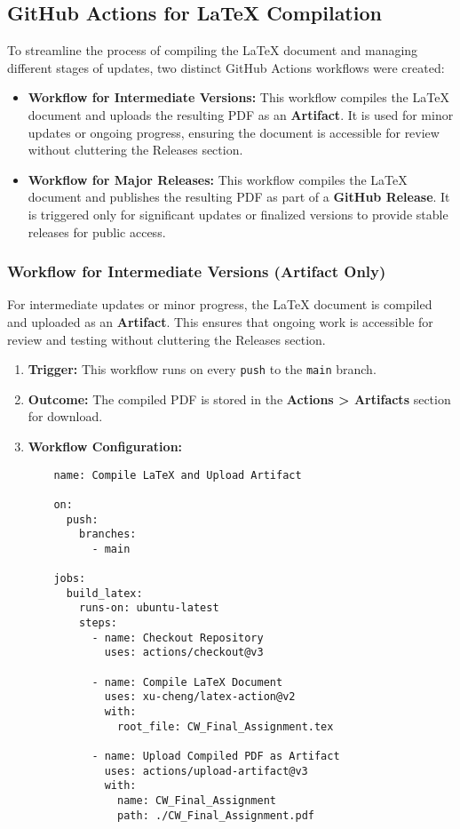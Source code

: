 \documentclass[12pt]{article}
\begin{document}
    \subsection{GitHub Actions for LaTeX Compilation}
    To streamline the process of compiling the LaTeX document and managing different stages of updates, two distinct GitHub Actions workflows were created:

    \begin{itemize}
        \item \textbf{Workflow for Intermediate Versions:}
        This workflow compiles the LaTeX document and uploads the resulting PDF as an \textbf{Artifact}. It is used for minor updates or ongoing progress, ensuring the document is accessible for review without cluttering the Releases section.
    
        \item \textbf{Workflow for Major Releases:}
        This workflow compiles the LaTeX document and publishes the resulting PDF as part of a \textbf{GitHub Release}. It is triggered only for significant updates or finalized versions to provide stable releases for public access.
    \end{itemize}

    \subsubsection{Workflow for Intermediate Versions (Artifact Only)}

For intermediate updates or minor progress, the LaTeX document is compiled and uploaded as an \textbf{Artifact}. This ensures that ongoing work is accessible for review and testing without cluttering the Releases section.

\begin{enumerate}
    \item \textbf{Trigger:} This workflow runs on every \texttt{push} to the \texttt{main} branch.
    \item \textbf{Outcome:} The compiled PDF is stored in the \textbf{Actions > Artifacts} section for download.
    \item \textbf{Workflow Configuration:}
    \begin{verbatim}
    name: Compile LaTeX and Upload Artifact

    on:
      push:
        branches:
          - main

    jobs:
      build_latex:
        runs-on: ubuntu-latest
        steps:
          - name: Checkout Repository
            uses: actions/checkout@v3

          - name: Compile LaTeX Document
            uses: xu-cheng/latex-action@v2
            with:
              root_file: CW_Final_Assignment.tex

          - name: Upload Compiled PDF as Artifact
            uses: actions/upload-artifact@v3
            with:
              name: CW_Final_Assignment
              path: ./CW_Final_Assignment.pdf
    \end{verbatim}
\end{enumerate}
\end{document}
